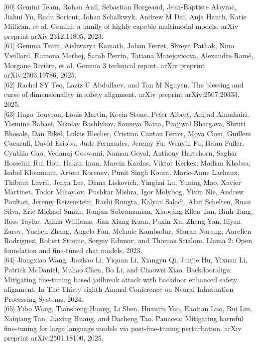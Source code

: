 \documentclass[10pt]{article}
\begin{document}
[60] Gemini Team, Rohan Anil, Sebastian Borgeaud, Jean-Baptiste Alayrac, Jiahui Yu, Radu Soricut, Johan Schalkwyk, Andrew M Dai, Anja Hauth, Katie Millican, et al. Gemini: a family of highly capable multimodal models. arXiv preprint arXiv:2312.11805, 2023.\\[0pt]
[61] Gemma Team, Aishwarya Kamath, Johan Ferret, Shreya Pathak, Nino Vieillard, Ramona Merhej, Sarah Perrin, Tatiana Matejovicova, Alexandre Ramé, Morgane Rivière, et al. Gemma 3 technical report. arXiv preprint arXiv:2503.19786, 2025.\\[0pt]
[62] Rachel SY Teo, Laziz U Abdullaev, and Tan M Nguyen. The blessing and curse of dimensionality in safety alignment. arXiv preprint arXiv:2507.20333, 2025.\\[0pt]
[63] Hugo Touvron, Louis Martin, Kevin Stone, Peter Albert, Amjad Almahairi, Yasmine Babaei, Nikolay Bashlykov, Soumya Batra, Prajjwal Bhargava, Shruti Bhosale, Dan Bikel, Lukas Blecher, Cristian Canton Ferrer, Moya Chen, Guillem Cucurull, David Esiobu, Jude Fernandes, Jeremy Fu, Wenyin Fu, Brian Fuller, Cynthia Gao, Vedanuj Goswami, Naman Goyal, Anthony Hartshorn, Saghar Hosseini, Rui Hou, Hakan Inan, Marcin Kardas, Viktor Kerkez, Madian Khabsa, Isabel Kloumann, Artem Korenev, Punit Singh Koura, Marie-Anne Lachaux, Thibaut Lavril, Jenya Lee, Diana Liskovich, Yinghai Lu, Yuning Mao, Xavier Martinet, Todor Mihaylov, Pushkar Mishra, Igor Molybog, Yixin Nie, Andrew Poulton, Jeremy Reizenstein, Rashi Rungta, Kalyan Saladi, Alan Schelten, Ruan Silva, Eric Michael Smith, Ranjan Subramanian, Xiaoqing Ellen Tan, Binh Tang, Ross Taylor, Adina Williams, Jian Xiang Kuan, Puxin Xu, Zheng Yan, Iliyan Zarov, Yuchen Zhang, Angela Fan, Melanie Kambadur, Sharan Narang, Aurelien Rodriguez, Robert Stojnic, Sergey Edunov, and Thomas Scialom. Llama 2: Open foundation and fine-tuned chat models, 2023.\\[0pt]
[64] Jiongxiao Wang, Jiazhao Li, Yiquan Li, Xiangyu Qi, Junjie Hu, Yixuan Li, Patrick McDaniel, Muhao Chen, Bo Li, and Chaowei Xiao. Backdooralign: Mitigating fine-tuning based jailbreak attack with backdoor enhanced safety alignment. In The Thirty-eighth Annual Conference on Neural Information Processing Systems, 2024.\\[0pt]
[65] Yibo Wang, Tiansheng Huang, Li Shen, Huanjin Yao, Haotian Luo, Rui Liu, Naiqiang Tan, Jiaxing Huang, and Dacheng Tao. Panacea: Mitigating harmful fine-tuning for large language models via post-fine-tuning perturbation. arXiv preprint arXiv:2501.18100, 2025.\\[0pt]
\end{document}
